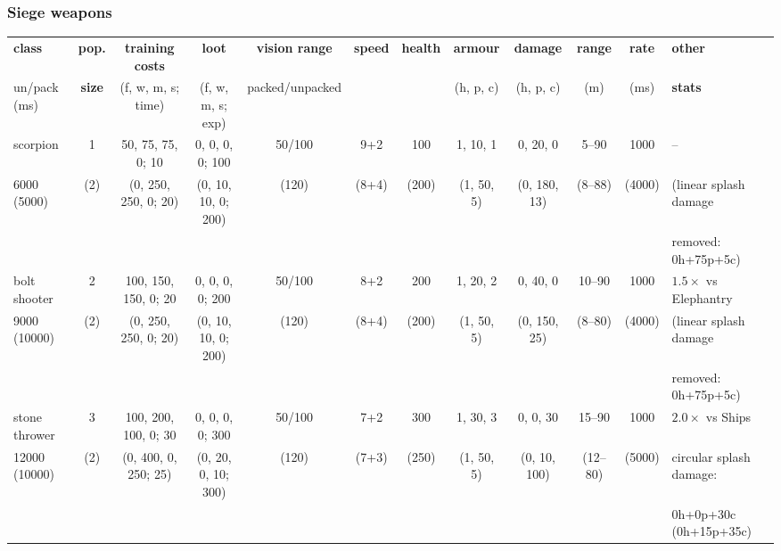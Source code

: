 \documentclass{article}
\begin{document}
\begin{landscape}
\subsubsection{Siege weapons}
\begin{tabular}{l|ccc|cccc|ccc|l}
{\bf class}    & {\bf pop.} & {\bf training costs} & {\bf loot}          & {\bf vision range} & {\bf speed} & {\bf health} & {\bf armour} & {\bf damage} & {\bf range} & {\bf rate} & {\bf other} \\
{un/pack (ms)} & {\bf size} & {(f, w, m, s; time)} & {(f, w, m, s; exp)} & {packed/unpacked}  &             &              & {(h, p, c)}  & {(h, p, c)}  & {(m)}       & {(ms)}     & {\bf stats} \\
\hline
scorpion      &  1  &  50,  75,  75,   0; 10  &  0,  0,  0,  0; 100  & 50/100&    9+2    &  100  &  1, 10, 1  &  0,  20,   0  &   5--90  &  1000  & -- \\
 6000 (5000)  & (2) &  (0, 250, 250,   0; 20) & (0, 10, 10,  0; 200) & (120) &   (8+4)   & (200) & (1, 50, 5) & (0, 180,  13) &  (8--88) & (4000) & (linear splash damage \\
              &     &                         &                      &       &           &       &            &               &          &        & removed: 0h+75p+5c) \\
\hline
bolt shooter  &  2  & 100, 150, 150,   0; 20  &  0,  0,  0,  0; 200  & 50/100&    8+2    &  200  &  1, 20, 2  &  0,  40,   0  &  10--90  &  1000  & $1.5\times$ vs Elephantry \\
 9000 (10000) & (2) &  (0, 250, 250,   0; 20) & (0, 10, 10,  0; 200) & (120) &   (8+4)   & (200) & (1, 50, 5) & (0, 150,  25) &  (8--80) & (4000) & (linear splash damage \\
              &     &                         &                      &       &           &       &            &               &          &        & removed: 0h+75p+5c) \\
\hline
stone thrower &  3  & 100, 200, 100,   0; 30  &  0,  0,  0,  0; 300  & 50/100&    7+2    &  300  &  1, 30, 3  &  0,   0,  30  &  15--90  &  1000  & $2.0\times$ vs Ships \\
12000 (10000) & (2) &  (0, 400,   0, 250; 25) & (0, 20,  0, 10; 300) & (120) &   (7+3)   & (250) & (1, 50, 5) & (0,  10, 100) & (12--80) & (5000) & circular splash damage: \\
              &     &                         &                      &       &           &       &            &               &          &        & 0h+0p+30c (0h+15p+35c) \\ 

\end{tabular}
\end{landscape}
\end{document}
